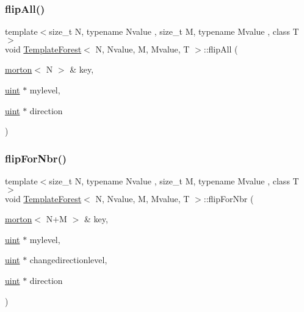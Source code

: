 \mbox{\label{classTemplateForest_a65bc67d5decd8895c6d397d506ba19c3}} 
\subsubsection{\texorpdfstring{flip\+All()}{flipAll()}}
{\footnotesize\ttfamily template$<$size\+\_\+t N, typename Nvalue , size\+\_\+t M, typename Mvalue , class T $>$ \\
void \mbox{\hyperlink{classTemplateForest}{Template\+Forest}}$<$ N, Nvalue, M, Mvalue, T $>$\+::flip\+All (\begin{DoxyParamCaption}\item[{\mbox{\hyperlink{definitions_8h_af8682350bd8bb38ee9023f7a0a310add}{morton}}$<$ N $>$ \&}]{key,  }\item[{\mbox{\hyperlink{definitions_8h_a69aa29b598b851b0640aa225a9e5d61d}{uint}} $\ast$}]{mylevel,  }\item[{\mbox{\hyperlink{definitions_8h_a69aa29b598b851b0640aa225a9e5d61d}{uint}} $\ast$}]{direction }\end{DoxyParamCaption})}

\mbox{\label{classTemplateForest_a59f1842488667c16b27c29618790d7c3}} 
\subsubsection{\texorpdfstring{flip\+For\+Nbr()}{flipForNbr()}}
{\footnotesize\ttfamily template$<$size\+\_\+t N, typename Nvalue , size\+\_\+t M, typename Mvalue , class T $>$ \\
void \mbox{\hyperlink{classTemplateForest}{Template\+Forest}}$<$ N, Nvalue, M, Mvalue, T $>$\+::flip\+For\+Nbr (\begin{DoxyParamCaption}\item[{\mbox{\hyperlink{definitions_8h_af8682350bd8bb38ee9023f7a0a310add}{morton}}$<$ N+M $>$ \&}]{key,  }\item[{\mbox{\hyperlink{definitions_8h_a69aa29b598b851b0640aa225a9e5d61d}{uint}} $\ast$}]{mylevel,  }\item[{\mbox{\hyperlink{definitions_8h_a69aa29b598b851b0640aa225a9e5d61d}{uint}} $\ast$}]{changedirectionlevel,  }\item[{\mbox{\hyperlink{definitions_8h_a69aa29b598b851b0640aa225a9e5d61d}{uint}} $\ast$}]{direction }\end{DoxyParamCaption})}

